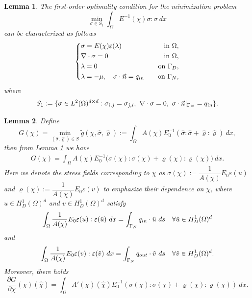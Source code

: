 \documentclass[10pt,a4paper]{amsart}
\newtheorem{lemma}{Lemma}
\begin{document}
\begin{lemma}\label{stress_equ}
    The first-order optimality condition for the minimization problem 
    \begin{equation}\label{stress_problem}
        \min_{\sigma\in S_1}\int_{\Omega}E^{-1}(\chi)\sigma:\sigma\ dx
    \end{equation}
    can be characterized as follows
    \begin{equation}
    \left\{
    \begin{aligned}
    &\sigma = E(\chi)\varepsilon(\lambda) \quad &\text{in } \Omega, \\
    &\nabla \cdot \sigma = 0 \quad &\text{in } \Omega, \\
    &\lambda = 0 \quad &\text{on } \Gamma_D, \\
    &\lambda = -\mu,\quad \sigma \cdot \vec{n} = q_{\rm in} \quad &\text{on } \Gamma_N,
    \end{aligned}
    \right.
    \end{equation}
    where
    $$ S_1:=\{\sigma\in L^2(\Omega)^{d\times d}:\sigma_{i,j}=\sigma_{j,i},\ \nabla\cdot\sigma=0,\ \sigma\cdot\vec{n}|_{\Gamma_N}=q_{\rm in}\}.$$
\end{lemma}

\begin{lemma}\label{F-derivative}
    Define $$G(\chi) = \min_{(\hat\sigma,\hat\varrho)\in S} \tilde{g}(\chi,\hat\sigma,\hat\varrho):=\int_{\Omega}A(\chi)E_0^{-1}(\hat\sigma:\hat\sigma+\hat\varrho:\hat\varrho)\ dx,$$
    then from Lemma \ref{stress_equ} we have
    \begin{eqnarray}
        G(\chi) =\int_\Omega A(\chi)E_0^{-1}\big(\sigma(\chi):\sigma(\chi)+\varrho(\chi):\varrho(\chi)\big)\ dx.\nonumber
    \end{eqnarray}
    Here we denote the stress fields corresponding to \(\chi\) as \(\sigma(\chi):=\dfrac{1}{A(\chi)}{E}_0\varepsilon(u)\) and \(\varrho(\chi):=\dfrac{1}{A(\chi)}{E}_0\varepsilon(v)\) to emphasize their dependence on \(\chi\),
    where $ u\in H_D^1(\Omega)^d $ and $ v\in H_D^1(\Omega)^d $ satisfy
    \begin{eqnarray} \label{u_weak}
    \int_{\Omega}\dfrac{1}{A(\chi)}{E}_0\varepsilon(u):\varepsilon(\hat{u})\ dx=\int_{\Gamma_N}q_{\rm in}\cdot\hat{u}\ ds\quad\forall\hat{u}\in H_D^1(\Omega)^d
    \end{eqnarray}
    and 
    \begin{eqnarray} \label{v_weak}
    \int_{\Omega}\dfrac{1}{A(\chi)}{E}_0\varepsilon(v):\varepsilon(\hat{v})\ dx=\int_{\Gamma_N}q_{\rm out}\cdot\hat{v}\ ds\quad\forall\hat{v}\in H_D^1(\Omega)^d.
    \end{eqnarray}
    Moreover, there holds
    $$\dfrac{\partial G}{\partial \chi}(\chi)(\hat{\chi})=\int_{\Omega}A'(\chi)(\hat{\chi}){E}_0^{-1}(\sigma(\chi):\sigma(\chi)+\varrho(\chi):\varrho(\chi))\ dx.$$
\end{lemma}
\end{document}
